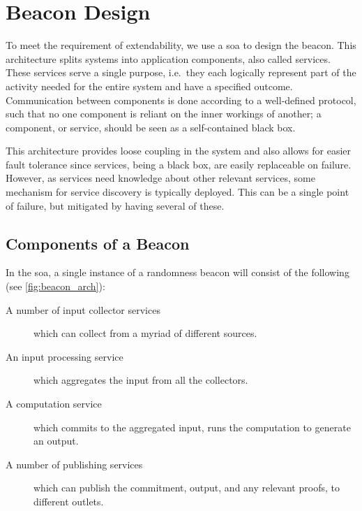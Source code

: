 \section{Beacon Design}


To meet the requirement of extendability, we use a \gls{soa} to design the beacon.
This architecture splits systems into application components, also called services.
These services serve a single purpose, i.e.\ they each logically represent part of the activity needed for the entire system and have a specified outcome.
Communication between components is done according to a well-defined protocol, such that no one component is reliant on the inner workings of another;
a component, or service, should be seen as a self-contained black box.

This architecture provides loose coupling in the system and also allows for easier fault tolerance since services, being a black box, are easily replaceable on failure.
However, as services need knowledge about other relevant services, some mechanism for service discovery is typically deployed.
This can be a single point of failure, but mitigated by having several of these. 

\subsection{Components of a Beacon}
\label{sub:components_of_a_beacon}
In the \gls{soa}, a single instance of a randomness beacon will consist of the following (see \cref{fig:beacon_arch}):
\begin{description}
    \item[A number of input collector services] which can collect from a myriad of different sources.
    \item[An input processing service] which aggregates the input from all the collectors.
    \item[A computation service] which commits to the aggregated input, runs the computation to generate an output.
    \item[A number of publishing services] which can publish the commitment, output, and any relevant proofs, to different outlets.
\end{description}

